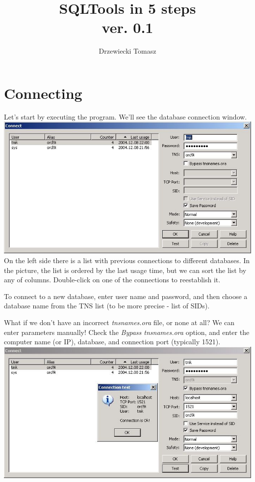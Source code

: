 \documentclass[a4paper,titlepage]{article}
\author{Drzewiecki Tomasz}
\title{SQLTools in 5 steps\\ver. 0.1}
\begin{document}
\maketitle
\tableofcontents
\newpage

\section{Connecting}
Let's start by executing the program. We'll see the database connection window.\\
\includegraphics[bb=0 0 696 370,width=\textwidth]{00login00}
On the left side there is a list with previous connections to different databases. In the picture, the list is ordered 
by the last usage time, but we can sort the list by any of columns.  Double-click on one of the connections to reestablish it.

To connect to a new database, enter user name and 
password, and then choose a database name from the TNS list (to be more precise - list of SIDs). 

What if we don't have an incorrect \emph{tnsnames.ora} file, or none at all? 
We can enter parameters manually! Check the \emph{Bypass tnsnames.ora} option, and enter the computer name (or IP), 
database, and connection port (typically 1521).\\
\includegraphics[bb=0 0 695 369,width=\textwidth]{00login01}
\end{document}
